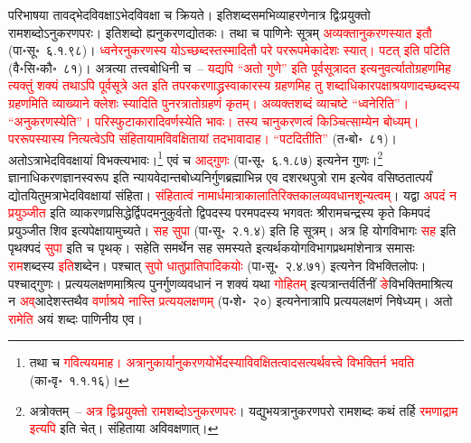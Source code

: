 \begin{sloppypar}
परिभाषया तावद्भेद\-विवक्षाऽभेद\-विवक्षा च क्रियते। इति\-शब्द\-समभिव्याहरणेनात्र द्विःप्रयुक्तो राम\-शब्दोऽनुकरण\-परः। इति\-शब्दो ह्यनुकरण\-द्योतकः। तथा च पाणिनेः सूत्रम् \textcolor{red}{अव्यक्तानुकरणस्यात इतौ} (पा॰सू॰~६.१.९८)। \textcolor{red}{ध्वनेरनुकरणस्य योऽच्छब्दस्तस्मादितौ परे पररूपमेकादेशः स्यात्। पटत् इति पटिति} (वै॰सि॰कौ॰~८१)। अत्रत्या तत्त्वबोधिनी च~– \textcolor{red}{यद्यपि “अतो गुणे” इति पूर्व\-सूत्रादत इत्यनुवर्त्यातो\-ग्रहणमिह त्यक्तुं शक्यं तथाऽपि पूर्व\-सूत्रे अत इति तपर\-करणाद्ध्रस्वाकारस्य ग्रहणमिह तु शब्दाधिकार\-पक्षाश्रयणादच्छब्दस्य ग्रहणमिति व्याख्याने क्लेशः स्यादिति पुनरत्रातो\-ग्रहणं कृतम्। अव्यक्त\-शब्दं व्याचष्टे “ध्वनेरिति”। “अनुकरणस्येति”। परिस्फुटाकारादि\-वर्णस्येति भावः। तस्य चानुकरणत्वं किञ्चित्साम्येन बोध्यम्। पर\-रूपस्यास्य नित्यत्वेऽपि संहितायामविवक्षितायां तदभावादाह। “पटदितीति”} (त॰बो॰~८१)। अतोऽत्राभेद\-विवक्षायां विभक्त्यभावः।\footnote{तथा च \textcolor{red}{गवित्ययमाह। अत्रानु\-कार्यानु\-करणयोर्भेदस्याविवक्षितत्वादसत्यर्थवत्त्वे विभक्तिर्न भवति} (का॰वृ॰~१.१.१६)।} एवं च \textcolor{red}{आद्गुणः} (पा॰सू॰~६.१.८७) इत्यनेन गुणः।\footnote{अत्रोक्तम्~– \textcolor{red}{अत्र द्विःप्रयुक्तो राम\-शब्दोऽनुकरण\-परः}। यद्युभयत्रानुकरण\-परो रामशब्दः कथं तर्हि \textcolor{red}{रमणाद्राम इत्यपि} इति चेत्। संहिताया अविवक्षणात्।} ज्ञानाधिकरण\-ज्ञान\-स्वरूप इति न्याय\-वेदान्त\-बोध्य\-निर्गुण\-ब्रह्माभिन्न एव दशरथ\-पुत्रो राम इत्येव वसिष्ठ\-तात्पर्यं द्योतयितुमत्राभेद\-विवक्षायां संहिता। \textcolor{red}{संहितात्वं नामार्ध\-मात्रा\-कालातिरिक्त\-काल\-व्यवधान\-शून्यत्वम्‌}। यद्वा \textcolor{red}{अपदं न प्रयुञ्जीत} इति व्याकरण\-प्रसिद्धेर्द्विपदमनुकुर्वतो द्विपदस्य परम\-पदस्य भगवतः श्रीरामचन्द्रस्य कृते किमपदं प्रयुञ्जीत शिव इत्यपेक्षायामुच्यते। \textcolor{red}{सह सुपा} (पा॰सू॰~२.१.४) इति हि सूत्रम्। अत्र हि योग\-विभागः \textcolor{red}{सह} इति पृथक्पदं \textcolor{red}{सुपा} इति च पृथक्। सहेति समर्थेन सह समस्यते इत्यर्थक\-योग\-विभाग\-प्रथमांशेनात्र समासः \textcolor{red}{राम}\-शब्दस्य \textcolor{red}{इति}\-शब्देन। पश्चात् \textcolor{red}{सुपो धातु\-प्रातिपादिकयोः} (पा॰सू॰~२.४.७१) इत्यनेन विभक्ति\-लोपः। पश्चाद्गुणः। प्रत्यय\-लक्षणमाश्रित्य पुनर्गुण\-व्यवधानं न शक्यं यथा \textcolor{red}{गो\-हितम्‌} इत्यत्रान्तर्वर्तिनीं \textcolor{red}{ङे}\-विभक्तिमाश्रित्य न \textcolor{red}{अव्‌}\-आदेशस्तथैव \textcolor{red}{वर्णाश्रये नास्ति प्रत्यय\-लक्षणम्‌} (प॰शे॰~२०) इत्यनेनात्रापि प्रत्यय\-लक्षणं निषेध्यम्। अतो \textcolor{red}{रामेति} अयं शब्दः पाणिनीय एव।\end{sloppypar}
